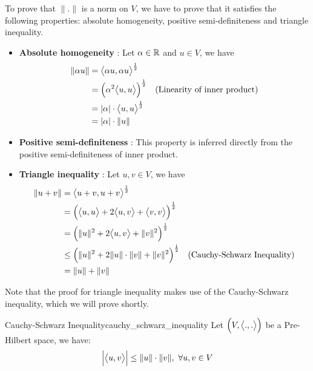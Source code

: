 \begin{proof*}
    To prove that $\|.\|$ is a norm on $V$, we have to prove that it satisfies the following properties: absolute homogeneity, positive semi-definiteness and triangle inequality. 

    \begin{itemize}
        \item \textbf{Absolute homogeneity} : Let $\alpha\in\mathbb{R}$ and $u\in V$, we have
        \begin{align*}
            \|\alpha u \| &= \inner{\alpha u, \alpha u}^{\frac{1}{2}} \\
            &= \bigRound{\alpha^2 \inner{u, u}}^{\frac{1}{2}} \ \ \ \text{(Linearity of inner product)} \\
            &= |\alpha| \cdot \inner{u, u}^{\frac{1}{2}} \\
            &= |\alpha| \cdot \|u\|
        \end{align*}

        \item \textbf{Positive semi-definiteness} : This property is inferred directly from the positive semi-definiteness of inner product.
        \item \textbf{Triangle inequality} : Let $u, v\in V$, we have
        \begin{align*}
            \|u + v\| &= \big<u+v, u+v\big>^{\frac{1}{2}} \\
            &= \Big( \big<u, u\big> + 2\big<u, v\big> + \big<v, v\big> \Big)^{\frac{1}{2}} \\
            &= \Big( \|u\|^2 + 2\big<u, v\big> + \|v\|^2 \Big)^{\frac{1}{2}} \\
            &\le \Big( \|u\|^2 + 2\|u\|\cdot\|v\| + \|v\|^2 \Big)^{\frac{1}{2}} \ \ \ \text{(Cauchy-Schwarz Inequality)} \\
            &= \|u\| + \|v\|
        \end{align*}
    \end{itemize}

    \noindent Note that the proof for triangle inequality makes use of the Cauchy-Schwarz inequality, which we will prove shortly. 
\end{proof*}

\begin{proposition}{Cauchy-Schwarz Inequality}{cauchy_schwarz_inequality}
    Let $\Big( V, \big<.,.\big> \Big)$ be a Pre-Hilbert space, we have:
    \begin{align*}
        \Big|\big<u, v\big>\Big| \le \|u\|\cdot\|v\|, \ \forall u, v \in V
    \end{align*}
\end{proposition}

